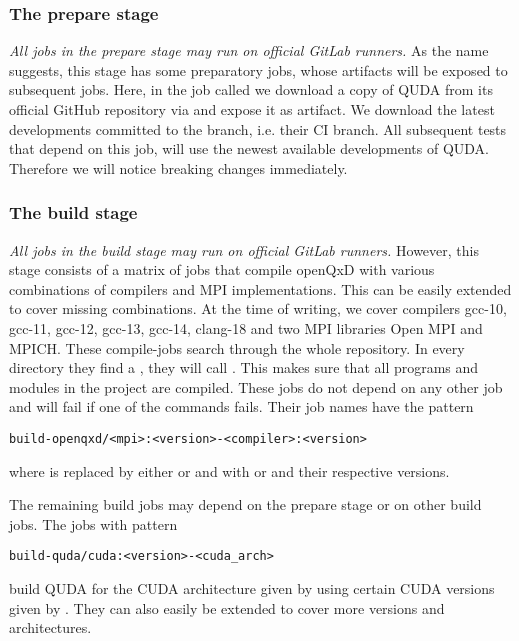 \subsubsection{The prepare stage}

\emph{All jobs in the prepare stage may run on official GitLab runners.} As the name suggests, this stage has some preparatory jobs, whose artifacts will be exposed to subsequent jobs. Here, in the job called  we download a copy of QUDA from its official GitHub repository \cite{github:quda} via  and expose it as artifact. We download the latest developments committed to the  branch, i.e. their CI branch. All subsequent tests that depend on this job, will use the newest available developments of QUDA. Therefore we will notice breaking changes immediately.

\subsubsection{The build stage}
\label{sec:cicd:pipeline:gitlab:build}

\emph{All jobs in the build stage may run on official GitLab runners.} However, this stage consists of a matrix of jobs that compile openQxD with various combinations of compilers and MPI implementations. This can be easily extended to cover missing combinations. At the time of writing, we cover compilers gcc-10, gcc-11, gcc-12, gcc-13, gcc-14, clang-18 and two MPI libraries Open MPI\cite{online:openmpi} and MPICH\cite{online:mpich}. These compile-jobs search through the whole repository. In every directory they find a , they will call . This makes sure that all programs and modules in the project are compiled. These jobs do not depend on any other job and will fail if one of the  commands fails. Their job names have the pattern
\begin{verbatim}
build-openqxd/<mpi>:<version>-<compiler>:<version>
\end{verbatim}
where  is replaced by either  or  and  with  or  and their respective versions.

The remaining build jobs may depend on the prepare stage or on other build jobs. The jobs with pattern
\begin{verbatim}
build-quda/cuda:<version>-<cuda_arch>
\end{verbatim}
build QUDA for the CUDA architecture given by  using certain CUDA versions given by . They can also easily be extended to cover more versions and architectures.


